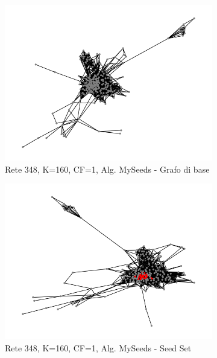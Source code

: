 \begin{figure}[h]
\begin{subfigure}[b]{0.3\textwidth}
    \centering
    \includegraphics[width=\textwidth]{images/rete348_alg3_k160_cf1/pre-influencing.png}
    \caption{Rete 348, K=160, CF=1, Alg. MySeeds - Grafo di base}
    \label{fig:sub1}
  \end{subfigure}
  \hfill
  \begin{subfigure}[b]{0.3\textwidth}
    \centering
    \includegraphics[width=\textwidth]{images/rete348_alg3_k160_cf1/influencing.png}
    \caption{Rete 348, K=160, CF=1, Alg. MySeeds - Seed Set}
    \label{fig:sub2}
  \end{subfigure}
  \hfill
  \begin{subfigure}[b]{0.3\textwidth}
    \centering

\end{subfigure}
\end{figure}
